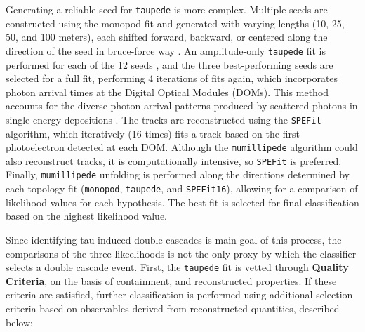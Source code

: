 Generating a reliable seed for \texttt{taupede} is more complex. Multiple seeds are constructed using the monopod fit and generated with varying lengths (10, 25, 50, and 100 meters), each shifted forward, backward, or centered along the direction of the seed in bruce-force way . An amplitude-only \texttt{taupede} fit is performed for each of the 12 seeds , and the three best-performing seeds are selected for a full fit, performing 4 iterations of fits again, which incorporates photon arrival times at the Digital Optical Modules (DOMs). This method accounts for the diverse photon arrival patterns produced by scattered photons in single energy depositions .
The tracks are reconstructed using the \texttt{SPEFit} algorithm, which iteratively (16 times) fits a track based on the first photoelectron detected at each DOM. Although the \texttt{mumillipede} algorithm could also reconstruct tracks, it is computationally intensive, so \texttt{SPEFit} is preferred. Finally, \texttt{mumillipede} unfolding is performed along the directions determined by each topology fit (\texttt{monopod}, \texttt{taupede}, and \texttt{SPEFit16}), allowing for a comparison of likelihood values for each hypothesis. The best fit is selected for final classification based on the highest likelihood value.

Since identifying tau-induced double cascades is main goal of this process, the comparisons of the three likeelihoods is not the only proxy by which the classifier selects a double cascade event. First, the \texttt{taupede} fit is vetted through \textbf{Quality Criteria}, on the basis of containment, and reconstructed properties. If these criteria are satisfied, further classification is performed using additional selection criteria based on observables derived from reconstructed quantities, described below:

